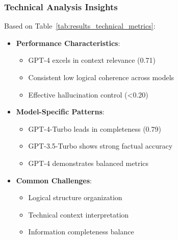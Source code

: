 \subsubsection{Technical Analysis Insights}
Based on Table~\ref{tab:results_technical_metrics}:
\begin{itemize}
    \item \textbf{Performance Characteristics}:
    \begin{itemize}
        \item GPT-4 excels in context relevance (0.71)
        \item Consistent low logical coherence across models
        \item Effective hallucination control (<0.20)
    \end{itemize}
    \item \textbf{Model-Specific Patterns}:
    \begin{itemize}
        \item GPT-4-Turbo leads in completeness (0.79)
        \item GPT-3.5-Turbo shows strong factual accuracy
        \item GPT-4 demonstrates balanced metrics
    \end{itemize}
    \item \textbf{Common Challenges}:
    \begin{itemize}
        \item Logical structure organization
        \item Technical context interpretation
        \item Information completeness balance
    \end{itemize}
\end{itemize}

